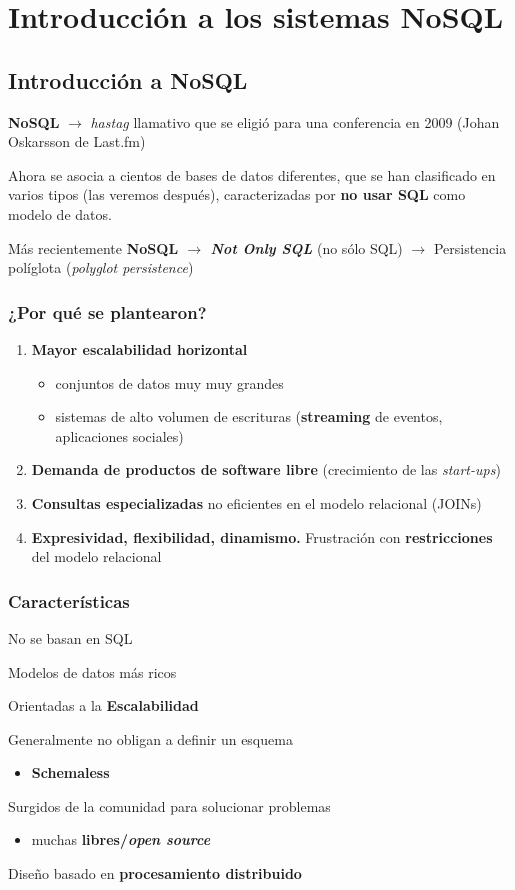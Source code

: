 \section{Introducción a los sistemas NoSQL}
\subsection{Introducción a NoSQL}
\textbf{NoSQL} $\longrightarrow$ \textit{hastag} llamativo que se eligió para una conferencia en 2009 (Johan Oskarsson de Last.fm)

Ahora se asocia a cientos de bases de datos diferentes, que se han clasificado en varios tipos (las veremos después), caracterizadas por \textbf{no usar SQL} como modelo de datos.

Más recientemente \textbf{NoSQL $\longrightarrow$ \textit{Not Only SQL}} (no sólo SQL) $\longrightarrow$ Persistencia políglota (\textit{polyglot persistence})

\subsubsection{¿Por qué se plantearon?}
\begin{enumerate}
	\item \textbf{Mayor escalabilidad horizontal}
	\begin{itemize}
		\item conjuntos de datos muy muy grandes
		\item sistemas de alto volumen de escrituras (\textbf{streaming} de eventos, aplicaciones sociales)
	\end{itemize}
	\item \textbf{Demanda de productos de software libre} (crecimiento de las \textit{start-ups})
	\item \textbf{Consultas especializadas} no eficientes en el modelo relacional (JOINs)
	\item \textbf{Expresividad, flexibilidad, dinamismo.} Frustración con \textbf{restricciones} del modelo relacional
\end{enumerate}
\subsubsection{Características}
No se basan en SQL

Modelos de datos más ricos

Orientadas a la \textbf{Escalabilidad}

Generalmente no obligan a definir un esquema
\begin{itemize}
	\item \textbf{Schemaless}
\end{itemize}
Surgidos de la comunidad para solucionar problemas
\begin{itemize}
	\item  muchas \textbf{libres/\emph{open source}}
\end{itemize}
Diseño basado en\textbf{ procesamiento distribuido}

